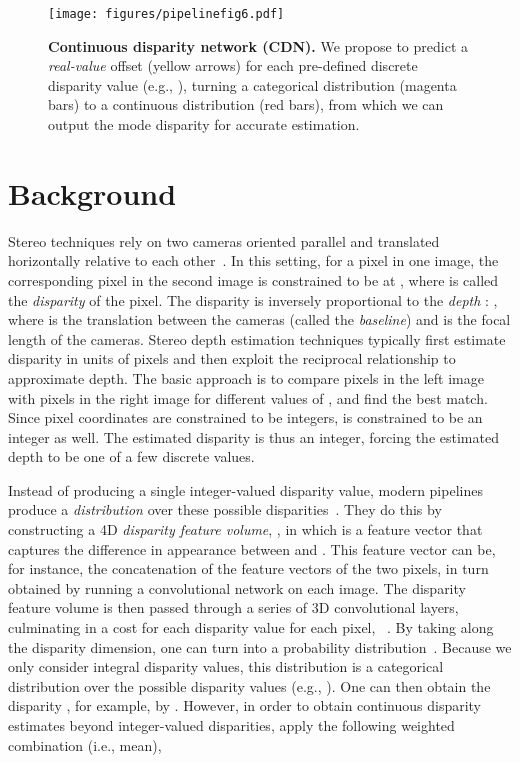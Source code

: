 \documentclass{article}
\newcommand{\ie}{i.e.\xspace}
\newcommand{\eg}{e.g.\xspace}
\begin{document}
\begin{figure}
\centering
\texttt{[image: figures/pipelinefig6.pdf]}
\vskip-5pt
\caption{\small\textbf{Continuous disparity network (CDN).} We propose to predict a \emph{real-value} offset ({\color{dandelion}yellow arrows}) for each pre-defined discrete disparity value (\eg, ), turning a categorical distribution ({\color{carnationpink}magenta bars}) to a continuous distribution ({\color{red}red bars}), from which we can output the mode disparity for accurate estimation.}
\label{fig:illustration}
\vskip-10pt
\end{figure}


 \section{Background}
\label{sec: related}



Stereo techniques rely on two cameras oriented parallel and translated horizontally relative to each other~\cite{yamaguchi2014efficient,zbontar2016stereo}.
In this setting, for a pixel  in one image, the corresponding pixel in the second image is constrained to be at , where  is called the \emph{disparity} of the pixel.
The disparity is inversely proportional to the \emph{depth}  : , where  is the translation between the cameras (called the \emph{baseline}) and  is the focal length of the cameras. Stereo depth estimation techniques typically first estimate disparity in units of pixels and then exploit the reciprocal relationship to approximate depth. 
The basic approach is to compare pixels  in the left image  with pixels  in the right image  for different values of , and find the best match.
Since pixel coordinates are constrained to be integers,  is constrained to be an integer as well.
The estimated disparity is thus an integer, forcing the estimated depth to be one of a few discrete values.

Instead of producing a single integer-valued disparity value, modern pipelines produce a \emph{distribution} over these possible disparities~\cite{kendall2017end,chang2018pyramid}.
They do this by constructing a 4D \emph{disparity feature volume}, , in which  is a feature vector that captures the difference in appearance between  and .
This feature vector can be, for instance, the concatenation of the feature vectors of the two pixels, in turn obtained by running a convolutional network on each image.
The disparity feature volume is then passed through a series of 3D convolutional layers, culminating in a cost for each disparity value  for each pixel, ~\cite{chang2018pyramid}.
By taking  along the disparity dimension, one can turn  into a probability distribution~\cite{luo2016efficient}.
Because we only consider integral disparity values, this distribution is a categorical distribution over the  possible disparity values (\eg, ).
One can then obtain the disparity , for example, by . However, in order to obtain continuous disparity estimates beyond integer-valued disparities, \cite{chang2018pyramid,wang2018anytime,kendall2017end,zhang2019ga} apply the following weighted combination (\ie, mean),
\end{document}
